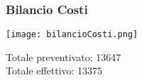 \begin{frame}
  \frametitle{Bilancio Costi}
  \texttt{[image: bilancioCosti.png]}

  Totale preventivato: 13647\\
  Totale effettivo: 13375
\end{frame}
